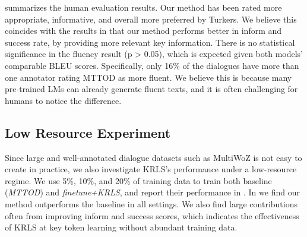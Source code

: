  summarizes the human evaluation results. 
Our method has been rated more appropriate, informative, and overall more preferred by Turkers.
We believe this coincides with the results in  that our method performs better in inform and success rate, by providing more relevant key information. 
There is no statistical significance in the fluency result (p > 0.05), which is expected given both models' comparable BLEU scores. Specifically, only 16\% of the dialogues have more than one annotator rating {MTTOD} as more fluent. We believe this is because many pre-trained LMs can already generate fluent texts, and it is often challenging for humans to notice the difference.

\begin{table*}[!t]
  \centering
  \caption{MultiWoZ end-to-end response generation performance using 5\%, 10\%, and 20\% of training data. ``ft+KRLS'' refers to \emph{finetune+KRLS}. Both models use GODEL-base as backbone. Results are shown as mean values over three runs.}
  \label{tbl:multiwoz_low_resource_full}
\end{table*}
\subsection{Low Resource Experiment}
\label{sec:Low Resource Experiment}
Since large and well-annotated dialogue datasets such as MultiWoZ \cite{multiwoz} is not easy to create in practice, we also investigate KRLS's performance under a low-resource regime. We use 5\%, 10\%, and 20\% of training data to train both baseline (\emph{MTTOD}) and \emph{finetune+KRLS}, and report their performance in . In  we find our method outperforms the baseline in all settings. We also find large contributions often from improving inform and success scores, which indicates the effectiveness of KRLS at key token learning without abundant training data.

